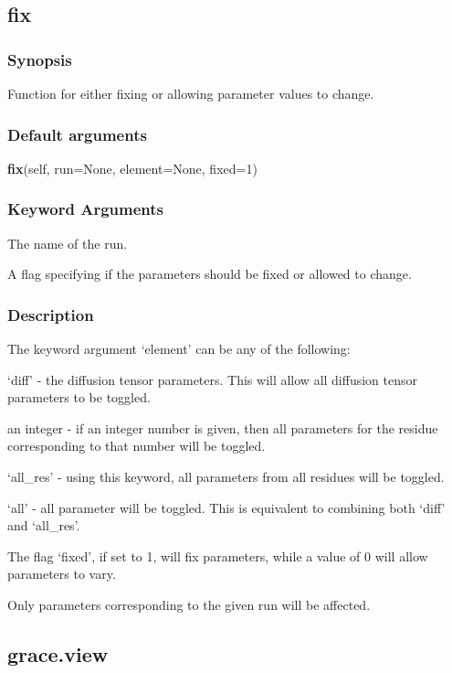 \subsection{fix}


\subsubsection{Synopsis}

Function for either fixing or allowing parameter values to change.

\subsubsection{Default arguments}

\textsf{\textbf{fix}(self, run=None, element=None, fixed=1)}


\subsubsection{Keyword Arguments}

  The name of the run.

  A flag specifying if the parameters should be fixed or allowed to change.

\subsubsection{Description}

The keyword argument `element' can be any of the following:

`diff' - the diffusion tensor parameters.  This will allow all diffusion tensor parameters
to be toggled.

an integer - if an integer number is given, then all parameters for the residue
corresponding to that number will be toggled.

`all\_res' - using this keyword, all parameters from all residues will be toggled.

`all' - all parameter will be toggled.  This is equivalent to combining both `diff' and
`all\_res'.


The flag `fixed', if set to 1, will fix parameters, while a value of 0 will allow parameters
to vary.


Only parameters corresponding to the given run will be affected.


\newpage

\subsection{grace.view}



